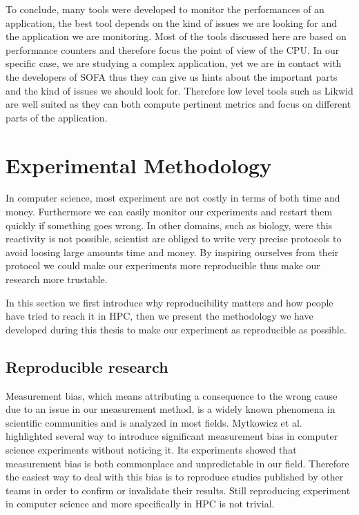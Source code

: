 To conclude, many tools were developed to monitor the performances of an application, the best tool depends on the kind of issues we are looking for and the application we are monitoring.
Most of the tools discussed here are based on performance counters and therefore focus the point of view of the \gls{CPU}.
In our specific case, we are studying a complex application, yet we are in contact with the developers of \gls{SOFA} thus they can give us hints about the important parts and the kind of issues we should look for.
Therefore low level tools such as \gls{Likwid} are well suited as they can both compute pertinent metrics and focus on different parts of the application.

\section{Experimental Methodology}
\label{sec:expe-methodo}

In computer science, most experiment are not costly in terms of both time and money.
Furthermore we can easily monitor our experiments and restart them quickly if something goes wrong.
In other domains, such as biology,  were this reactivity is not possible, scientist are obliged to write very precise protocols to avoid loosing large amounts time and money.
By inspiring ourselves from their protocol we could make our experiments more reproducible thus make our research more trustable.

In this section we first introduce why reproducibility matters and how people have tried to reach it in \gls{HPC}, then we present the methodology we have developed during this thesis to make our experiment as reproducible as possible.


\subsection{Reproducible research}

Measurement bias, which means attributing a consequence to the wrong cause due to an issue in our measurement method, is a widely known phenomena in scientific communities and is analyzed in most fields.
Mytkowicz et al.~\cite{Mytkowicz09Producing} highlighted several way to introduce significant measurement bias in computer science experiments without noticing it.
Its experiments showed that measurement bias is both commonplace and unpredictable in our field.
Therefore the easiest way to deal with this bias is to reproduce studies published by other teams in order to confirm or invalidate their results.
Still reproducing experiment in computer science and more specifically in \gls{HPC} is not trivial.


